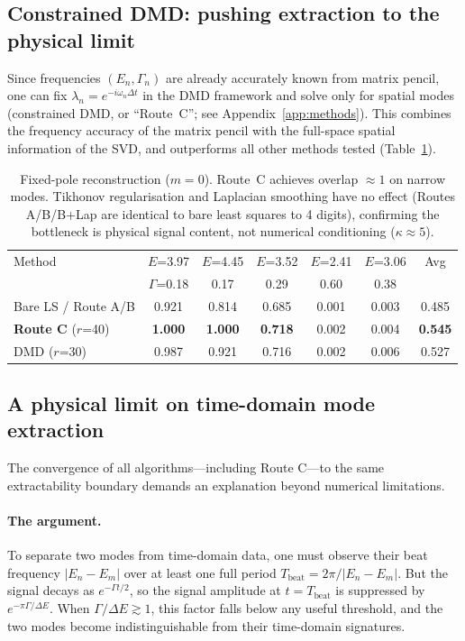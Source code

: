 \documentclass[11pt,a4paper]{article}
\begin{document}
\subsection{Constrained DMD: pushing extraction to the physical limit}

Since frequencies $(E_n, \Gamma_n)$ are already accurately known from
matrix pencil, one can fix $\lambda_n = e^{-i\omega_n\Delta t}$ in
the DMD framework and solve only for spatial modes (constrained DMD,
or ``Route~C''; see Appendix~\ref{app:methods}).  This combines the
frequency accuracy of the matrix pencil with the full-space spatial
information of the SVD, and outperforms all other methods tested
(Table~\ref{tab:fixedpole}).

\begin{table}[h]
\centering
\caption{Fixed-pole reconstruction ($m = 0$). Route~C achieves
overlap $\approx 1$ on narrow modes.  Tikhonov regularisation and
Laplacian smoothing have no effect (Routes A/B/B+Lap are identical
to bare least squares to 4 digits), confirming the bottleneck is
physical signal content, not numerical conditioning ($\kappa \approx 5$).}
\label{tab:fixedpole}
\begin{tabular}{lcccccc}
\toprule
Method & $E$=3.97 & $E$=4.45 & $E$=3.52 & $E$=2.41 & $E$=3.06 & Avg \\
 & $\Gamma$=0.18 & 0.17 & 0.29 & 0.60 & 0.38 & \\
\midrule
Bare LS / Route A/B  & 0.921 & 0.814 & 0.685 & 0.001 & 0.003 & 0.485 \\
\textbf{Route C} ($r$=40) & \textbf{1.000} & \textbf{1.000} & \textbf{0.718} & 0.002 & 0.004 & \textbf{0.545} \\
DMD ($r$=30)     & 0.987 & 0.921 & 0.716 & 0.002 & 0.006 & 0.527 \\
\bottomrule
\end{tabular}
\end{table}

\subsection{A physical limit on time-domain mode extraction}

The convergence of all algorithms---including Route C---to the same
extractability boundary demands an explanation beyond numerical
limitations.

\paragraph{The argument.}
To separate two modes from time-domain data, one must observe their
beat frequency $|E_n - E_m|$ over at least one full period
$T_\text{beat} = 2\pi / |E_n - E_m|$.  But the signal decays as
$e^{-\Gamma t/2}$, so the signal amplitude at $t = T_\text{beat}$
is suppressed by $e^{-\pi\Gamma/\Delta E}$.  When
$\Gamma/\Delta E \gtrsim 1$, this factor falls below any useful
threshold, and the two modes become indistinguishable from their
time-domain signatures.
\end{document}
